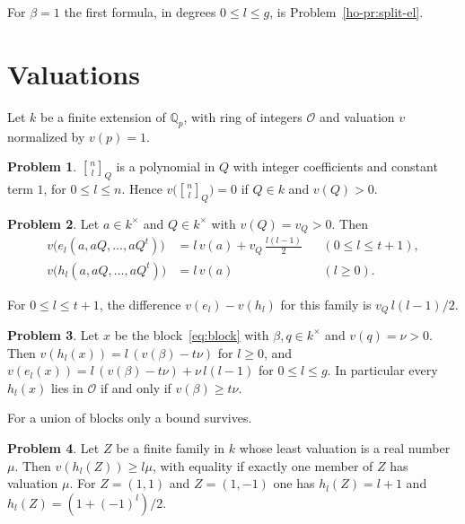 \documentclass[reqno]{amsart}
\theoremstyle{definition}
\newtheorem{problem}{Problem}[section]
\theoremstyle{plain}
\theoremstyle{remark}
\newcommand{\Q}{\mathbb{Q}}
\newcommand{\Oc}{\mathcal{O}}
\newcommand{\qbinom}[3]{\genfrac{[}{]}{0pt}{}{#1}{#2}_{#3}}
\begin{document}
For \(\beta = 1\) the first formula, in degrees \(0 \le l \le g\), is Problem~\ref{ho-pr:split-el}.

\section{Valuations}\label{sec:val}

Let \(k\) be a finite extension of \(\Q_p\), with ring of integers \(\Oc\) and valuation \(v\) normalized by \(v(p) = 1\).

\begin{problem}\label{pr:gauss-unit}
\(\qbinom{n}{l}{Q}\) is a polynomial in \(Q\) with integer coefficients and constant term \(1\), for \(0 \le l \le n\).  Hence \(v\bigl(\qbinom{n}{l}{Q}\bigr) = 0\) if \(Q \in k\) and \(v(Q) > 0\).
\end{problem}

\begin{problem}\label{pr:block-val}
Let \(a \in k^\times\) and \(Q \in k^\times\) with \(v(Q) = v_Q > 0\).  Then
\begin{align*}
  v\bigl(e_l(a, aQ, \dots, aQ^t)\bigr) &= l\,v(a) + v_Q\,\frac{l(l-1)}{2} && (0 \le l \le t+1) , \\
  v\bigl(h_l(a, aQ, \dots, aQ^t)\bigr) &= l\,v(a) && (l \ge 0) .
\end{align*}
\end{problem}

For \(0\le l\le t+1\), the difference \(v(e_l)-v(h_l)\) for this family is \(v_Q\,l(l-1)/2\).

\begin{problem}\label{pr:sym-val}
Let \(x\) be the block~\eqref{eq:block} with \(\beta, q \in k^\times\) and \(v(q) = \nu > 0\).  Then \(v(h_l(x)) = l\,(v(\beta) - t\nu)\) for \(l \ge 0\), and \(v(e_l(x)) = l\,(v(\beta) - t\nu) + \nu\, l(l-1)\) for \(0 \le l \le g\).  In particular every \(h_l(x)\) lies in \(\Oc\) if and only if \(v(\beta) \ge t\nu\).
\end{problem}

For a union of blocks only a bound survives.

\begin{problem}\label{pr:union-val}
Let \(Z\) be a finite family in \(k\) whose least valuation is a real number \(\mu\).  Then \(v(h_l(Z)) \ge l\mu\), with equality if exactly one member of \(Z\) has valuation \(\mu\).  For \(Z = (1, 1)\) and \(Z = (1, -1)\) one has \(h_l(Z) = l + 1\) and \(h_l(Z) = (1 + (-1)^l)/2\).
\end{problem}
\end{document}
